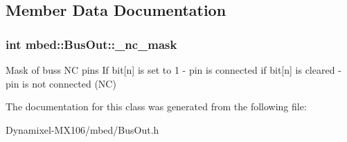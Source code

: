 \subsection{Member Data Documentation}
\subsubsection[{\texorpdfstring{\+\_\+nc\+\_\+mask}{_nc_mask}}]{\setlength{\rightskip}{0pt plus 5cm}int mbed\+::\+Bus\+Out\+::\+\_\+nc\+\_\+mask\hspace{0.3cm}{\ttfamily [protected]}}\hypertarget{classmbed_1_1_bus_out_ad044deaa2ea58e94340ee7d2c5b5779a}{}\label{classmbed_1_1_bus_out_ad044deaa2ea58e94340ee7d2c5b5779a}
Mask of bus\textquotesingle{}s NC pins If bit\mbox{[}n\mbox{]} is set to 1 -\/ pin is connected if bit\mbox{[}n\mbox{]} is cleared -\/ pin is not connected (NC) 

The documentation for this class was generated from the following file\+:\begin{DoxyCompactItemize}
\item 
Dynamixel-\/\+M\+X106/mbed/Bus\+Out.\+h\end{DoxyCompactItemize}
